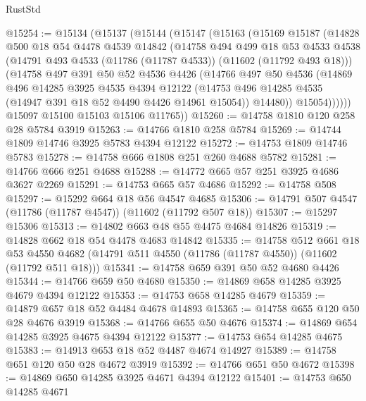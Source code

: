 \begin{lexlean}{RustStd}
\begin{coremodule}
@15254 := @15134
    (@15137
      (@15144
        (@15147
          (@15163
            (@15169
              @15187
              (@14828
                @500
                @18
                @54
                @4478
                @4539
                @14842
                (@14758
                  @494
                  @499
                  @18
                  @53
                  @4533
                  @4538
                  (@14791 @493 @4533 (@11786 (@11787 @4533)) (@11602 (@11792 @493 @18)))
                  (@14758
                    @497
                    @391
                    @50
                    @52
                    @4536
                    @4426
                    (@14766
                      @497
                      @50
                      @4536
                      (@14869
                        @496
                        @14285
                        @3925
                        @4535
                        @4394
                        @12122
                        (@14753 @496 @14285 @4535 (@14947 @391 @18 @52 @4490 @4426 @14961 @15054))
                        @14480))
                    @15054))))))
        @15097
        @15100
        @15103
        @15106
        @11765))
@15260 := @14758 @1810 @120 @258 @28 @5784 @3919
@15263 := @14766 @1810 @258 @5784
@15269 := @14744 @1809 @14746 @3925 @5783 @4394 @12122
@15272 := @14753 @1809 @14746 @5783
@15278 := @14758 @666 @1808 @251 @260 @4688 @5782
@15281 := @14766 @666 @251 @4688
@15288 := @14772 @665 @57 @251 @3925 @4686 @3627 @2269
@15291 := @14753 @665 @57 @4686
@15292 := @14758 @508
@15297 := @15292 @664 @18 @56 @4547 @4685
@15306 := @14791 @507 @4547 (@11786 (@11787 @4547)) (@11602 (@11792 @507 @18))
@15307 := @15297 @15306
@15313 := @14802 @663 @48 @55 @4475 @4684 @14826
@15319 := @14828 @662 @18 @54 @4478 @4683 @14842
@15335 := @14758
    @512
    @661
    @18
    @53
    @4550
    @4682
    (@14791 @511 @4550 (@11786 (@11787 @4550)) (@11602 (@11792 @511 @18)))
@15341 := @14758 @659 @391 @50 @52 @4680 @4426
@15344 := @14766 @659 @50 @4680
@15350 := @14869 @658 @14285 @3925 @4679 @4394 @12122
@15353 := @14753 @658 @14285 @4679
@15359 := @14879 @657 @18 @52 @4484 @4678 @14893
@15365 := @14758 @655 @120 @50 @28 @4676 @3919
@15368 := @14766 @655 @50 @4676
@15374 := @14869 @654 @14285 @3925 @4675 @4394 @12122
@15377 := @14753 @654 @14285 @4675
@15383 := @14913 @653 @18 @52 @4487 @4674 @14927
@15389 := @14758 @651 @120 @50 @28 @4672 @3919
@15392 := @14766 @651 @50 @4672
@15398 := @14869 @650 @14285 @3925 @4671 @4394 @12122
@15401 := @14753 @650 @14285 @4671

\end{coremodule}
\end{lexlean}

